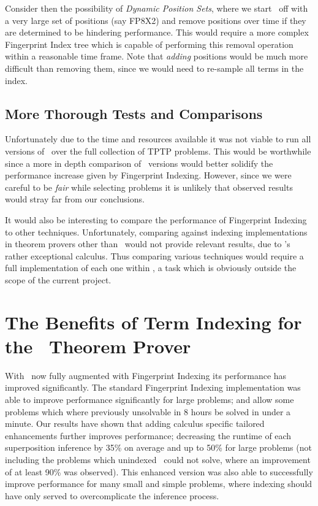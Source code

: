 Consider then the possibility of \emph{Dynamic Position Sets}, where we start \beagle\ off with a
very large set of positions (say FP8X2) and remove positions over time if they
are determined to be hindering performance. This would require a more complex Fingerprint
Index tree which is capable of performing this removal operation within a reasonable
time frame. Note that \emph{adding} positions would be much more difficult than removing them, since
we would need to re-sample all terms in the index.

\subsection{More Thorough Tests and Comparisons}

Unfortunately due to the time and resources available it was not viable to run
all versions of \beagle\ over the full collection of TPTP problems. This would
be worthwhile since a more in depth comparison 
of \beagle\ versions would better solidify the performance increase given by Fingerprint Indexing.
However, since we were careful to be \emph{fair}
while selecting problems it is unlikely that observed results would stray far
from our conclusions.

It would also be interesting to compare the performance of Fingerprint Indexing
to other techniques. Unfortunately, comparing against indexing implementations in theorem provers other
than \beagle\ would not provide relevant results, due to \beagle's rather
exceptional calculus. Thus comparing various techniques would require a full
implementation of each one within \beagle, a task which is obviously outside the scope of the current
project. 

\section{The Benefits of Term Indexing for the \Beagle\ Theorem Prover }
\label{sec:why}

With \beagle\ now fully augmented with Fingerprint Indexing its performance
has improved significantly. The standard Fingerprint Indexing implementation was
able to improve performance significantly for large problems; and allow some
problems which where previously unsolvable in 8 hours be solved in under a minute.
Our results have shown that adding calculus specific tailored
enhancements further improves performance; decreasing the runtime of each superposition inference by 35\%
on average and up to 50\% for large problems (not including the problems which unindexed \beagle\ could not solve,
where an improvement of at least 90\% was observed). This enhanced version
was also able to successfully improve performance for many small and simple problems,
where indexing should have only served to overcomplicate the inference process.

